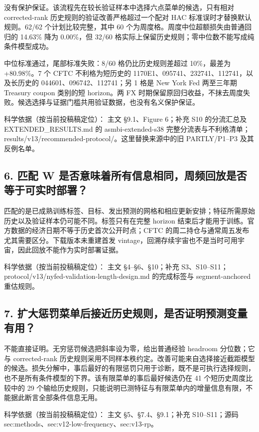 \documentclass[11pt,a4paper]{article}
\begin{document}
没有保护保证。该流程先在较长验证样本中选择六点菜单的候选，只有相对 corrected-rank 历史规则的验证改善严格超过一个配对 HAC 标准误时才替换默认规则。62/62 个计划比较完整，其中 60 个为周度格。周度中位超额损失由普通回归的 14.63\% 降为 0.00\%，但 32/60 格实际上保留历史规则；零中位数不能写成纯条件模型成功。

中位标准通过，尾部标准失败：8/60 格仍比历史规则差超过 10\%，最差为 +80.98\%。7 个 CFTC 不利格为短历史的 1170E1、095741、232741、112741，以及长历史的 044601、096742、112741；另 1 格是 New York Fed 两至三年期 Treasury coupon 类别的短 horizon。两 FX 时期保留原回归收益，不抹去周度失败。候选选择与证据门槛共用验证数据，也没有名义保护保证。

科学依据（按当前投稿稿定位）： 主文 §9.1、Figure 6；补充 S10 的分流汇总及 EXTENDED\_RESULTS.md 的 asmbi-extended-s38 完整分流表与不利格清单；results/v13/recommended-protocol/。这里替换来源中的旧 PARTLY/P1--P3 及其反例名单。

\subsection*{6. 匹配 W 是否意味着所有信息相同，周频回放是否等于可实时部署？}

匹配的是已成熟训练标签、目标、发出预测的网格和相应更新安排；特征所需原始历史以及验证样本仍可能不同。标签只有在完整 horizon 结束后才能用于训练。官方数据的经济日期不等于历史首次公开时点；CFTC 的周二持仓与通常周五发布尤其需要区分。下载版本未重建首发 vintage，回溯存续宇宙也不是当时可用宇宙，因此回放不能作为实时部署证据。

科学依据（按当前投稿稿定位）： 主文 §4--§6、§10；补充 S3、S10--S11；protocol/v13/nyfed-validation-length-design.md 的完成标签与 segment-anchored 重估规则。

\subsection*{7. 扩大惩罚菜单后接近历史规则，是否证明预测变量有用？}

不能直接证明。无穷惩罚候选把斜率设为零，给出普通经验 headroom 分位数；它与 corrected-rank 历史规则采用不同样本秩约定。改善可能来自选择接近截距模型的候选。损失分解中，事后最好的有限惩罚只用于诊断，既不是可执行选择规则，也不是所有条件模型的下界。该有限菜单的事后最好候选仍在 41 个短历史周度比较中的 29 个输给历史规则，只能说明已测特征与有限菜单内的增量信息有限，不能据此断言全部条件信息无用。

科学依据（按当前投稿稿定位）： 主文 §5、§7.4、§9.1；补充 S10--S11；源码 sec:methods、sec:v12-low-frequency、sec:v13-rp。
\end{document}

